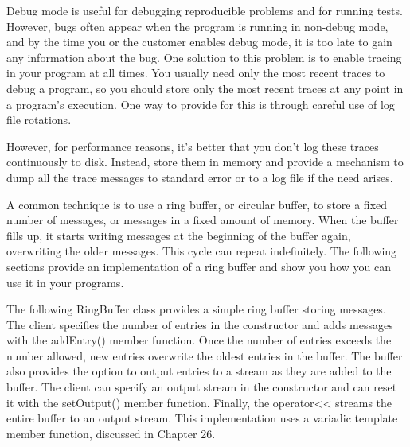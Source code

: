 
Debug mode is useful for debugging reproducible problems and for running tests. However, bugs often appear when the program is running in non-debug mode, and by the time you or the customer enables debug mode, it is too late to gain any information about the bug. One solution to this problem is to enable tracing in your program at all times. You usually need only the most recent traces to debug a program, so you should store only the most recent traces at any point in a program’s execution. One way to provide for this is through careful use of log file rotations.

However, for performance reasons, it’s better that you don’t log these traces continuously to disk. Instead, store them in memory and provide a mechanism to dump all the trace messages to standard error or to a log file if the need arises.

A common technique is to use a ring buffer, or circular buffer, to store a fixed number of messages, or messages in a fixed amount of memory. When the buffer fills up, it starts writing messages at the beginning of the buffer again, overwriting the older messages. This cycle can repeat indefinitely. The following sections provide an implementation of a ring buffer and show you how you can use it in your programs.


The following RingBuffer class provides a simple ring buffer storing messages. The client specifies the number of entries in the constructor and adds messages with the addEntry() member function. Once the number of entries exceeds the number allowed, new entries overwrite the oldest entries in the buffer. The buffer also provides the option to output entries to a stream as they are added to the buffer. The client can specify an output stream in the constructor and can reset it with the setOutput() member function. Finally, the operator<{}< streams the entire buffer to an output stream. This implementation uses a variadic template member function, discussed in Chapter 26.

